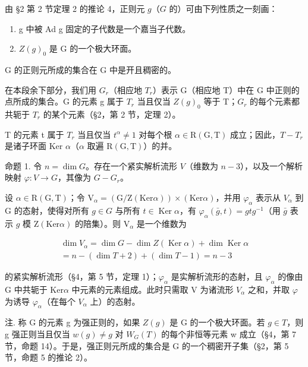 由 §2 第 2 节定理 2 的推论 4，正则元 \(g\)（\(G\) 的）可由下列性质之一刻画：

\begin{enumerate}
\def\labelenumi{\alph{enumi})}
\item
  g 中被 Ad g 固定的子代数是一个嘉当子代数。
\item
  \(Z(g)_{0}\) 是 G 的一个极大环面。
\end{enumerate}

\(\mathrm{G}\) 的正则元所成的集合在 \(\mathrm{G}\) 中是开且稠密的。

在本段余下部分，我们用 \(G_{r}\)（相应地 \(T_{r}\)）表示 G（相应地 T）中在 G 中正则的点所成的集合。G 的元素 g 属于 \(T_{r}\) 当且仅当 \(Z(g)_{0}\) 等于 T；\(G_{r}\) 的每个元素都共轭于 \(T_{r}\) 的某个元素（§2，第 2 节，定理 2）。

T 的元素 t 属于 \(T_{r}\) 当且仅当 \(t^{\alpha} \neq 1\) 对每个根 \(\alpha \in \mathrm{R}(\mathrm{G}, \mathrm{T})\) 成立；因此，\(T - T_{r}\) 是诸子环面 Ker \(\alpha\)（\(\alpha\) 取遍 \(\mathrm{R}(\mathrm{G}, \mathrm{T})\)）的并。

命题 1. 令 \(n = \dim G\)。存在一个紧实解析流形 \(V\)（维数为 \(n - 3\)），以及一个解析映射 \(\varphi : V \to G\)，其像为 \(G - G_r\)。

设 \(\alpha\in\mathrm{R}(\mathrm{G},\mathrm{T})\)；令 \(\mathrm{V}_{\alpha}=(\mathrm{G}/\mathrm{Z}(\mathrm{Ker}\alpha))\times(\mathrm{Ker}\alpha)\)，并用 \(\varphi_{\alpha}\) 表示从 \(V_{\alpha}\) 到 G 的态射，使得对所有 \(g\in G\) 与所有 \(t\in\operatorname{Ker}\alpha\)，有 \(\varphi_{\alpha}(\bar{g},t) = gtg^{-1}\)（用 \(\bar{g}\) 表示 \(g\) 模 \(\mathrm{Z}(\mathrm{Ker}\alpha)\) 的陪集）。则 \(\mathrm{V}_{\alpha}\) 是一个维数为

\[
\begin{array}{c} \dim V _ {\alpha} = \dim G - \dim Z (\operatorname{Ker} \alpha) + \dim \operatorname{Ker} \alpha \\ = n - (\dim T + 2) + (\dim T - 1) = n - 3 \end{array}
\]

的紧实解析流形（§4，第 5 节，定理 1）；\(\varphi_{\alpha}\) 是实解析流形的态射，且 \(\varphi_{\alpha}\) 的像由 G 中共轭于 \(\mathrm{Ker} \alpha\) 中元素的元素组成。此时只需取 V 为诸流形 \(V_{\alpha}\) 之和，并取 \(\varphi\) 为诱导 \(\varphi_{\alpha}\)（在每个 \(V_{\alpha}\) 上）的态射。

注. 称 G 的元素 g 为强正则的，如果 \(Z(g)\) 是 G 的一个极大环面。若 \(g \in T\)，则 g 强正则当且仅当 \(w(g) \neq g\) 对 \(W_{G}(T)\) 的每个非恒等元素 w 成立（§4，第 7 节，命题 14）。于是，强正则元所成的集合是 G 的一个稠密开子集（§2，第 5 节，命题 5 的推论 2）。


